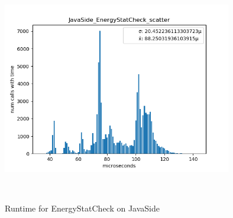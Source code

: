     \begin{figure}[H]
	    \centering
	    \includegraphics[width=10cm,height=10cm,keepaspectratio]{jmh/jni-overhead/JavaSide_EnergyStatCheck_scatter.png}
	    \caption{Runtime for EnergyStatCheck on JavaSide}
	    \label{fig:jolteon-jmh-runtime-energystatcheck-java}
    \end{figure}
    
